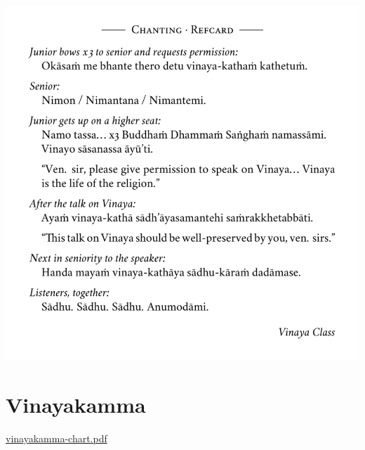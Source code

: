 \href{./includes/docs/chanting-refcard.pdf}{\includegraphics{./includes/docs/chanting-refcard-thumb.png}}

\section{Vinayakamma}

\href{./includes/docs/vinayakamma-chart.pdf}{vinayakamma-chart.pdf}

